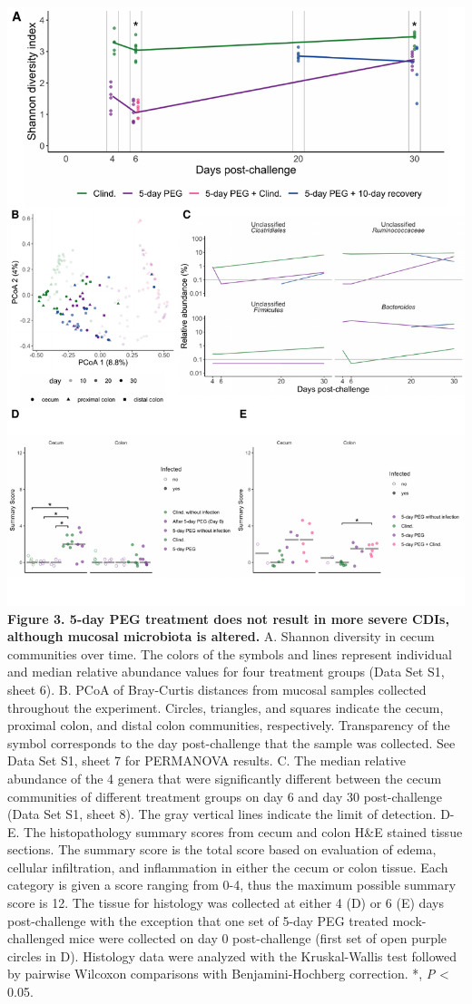 \documentclass[
  11pt,
]{article}
\begin{document}
\includegraphics{figure_3.pdf} \textbf{Figure 3. 5-day PEG treatment
does not result in more severe CDIs, although mucosal microbiota is
altered.} A. Shannon diversity in cecum communities over time. The
colors of the symbols and lines represent individual and median relative
abundance values for four treatment groups (Data Set S1, sheet 6). B.
PCoA of Bray-Curtis distances from mucosal samples collected throughout
the experiment. Circles, triangles, and squares indicate the cecum,
proximal colon, and distal colon communities, respectively. Transparency
of the symbol corresponds to the day post-challenge that the sample was
collected. See Data Set S1, sheet 7 for PERMANOVA results. C. The median
relative abundance of the 4 genera that were significantly different
between the cecum communities of different treatment groups on day 6 and
day 30 post-challenge (Data Set S1, sheet 8). The gray vertical lines
indicate the limit of detection. D-E. The histopathology summary scores
from cecum and colon H\&E stained tissue sections. The summary score is
the total score based on evaluation of edema, cellular infiltration, and
inflammation in either the cecum or colon tissue. Each category is given
a score ranging from 0-4, thus the maximum possible summary score is 12.
The tissue for histology was collected at either 4 (D) or 6 (E) days
post-challenge with the exception that one set of 5-day PEG treated
mock-challenged mice were collected on day 0 post-challenge (first set
of open purple circles in D). Histology data were analyzed with the
Kruskal-Wallis test followed by pairwise Wilcoxon comparisons with
Benjamini-Hochberg correction. *, \emph{P} \textless{} 0.05. \newpage
\end{document}
